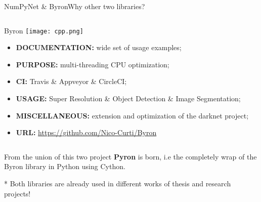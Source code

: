 \documentclass[10pt, technote, oribibl, unicode]{beamer}
\begin{document}
\begin{frame}{NumPyNet \& Byron}{Why other two libraries?}
\begin{columns}
\begin{column}{0.5\textwidth}
\begin{alertblock}{Byron \hfill\texttt{[image: cpp.png]}}
\begin{itemize}
          \item \textbf{DOCUMENTATION:} wide set of usage examples;
          \item \textbf{PURPOSE:} multi-threading CPU optimization;
          \item \textbf{CI:} Travis \& Appveyor \& CircleCI;
          \item \textbf{USAGE:} Super Resolution \& Object Detection \& Image Segmentation;
          \item \textbf{MISCELLANEOUS:} extension and optimization of the \textsf{darknet} project;
          \item \textbf{URL:} \url{https://github.com/Nico-Curti/Byron}
        \end{itemize}
      \end{alertblock}
    \end{column}

  \end{columns}

  \vspace{0.25cm}

  \scriptsize{From the union of this two project \textbf{Pyron} is born, i.e the completely wrap of the \textsf{Byron} library in \textsf{Python} using \textsf{Cython}.}

  \scriptsize{* Both libraries are already used in different works of thesis and research projects!}

\end{frame}
\end{document}
